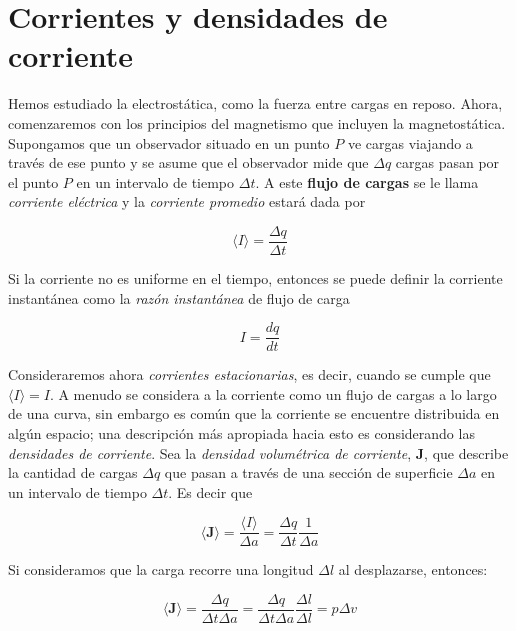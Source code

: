 \section{Corrientes y densidades de corriente}
Hemos estudiado la electrostática, como la fuerza entre cargas en reposo. Ahora, comenzaremos con los principios del magnetismo que incluyen la magnetostática. 
Supongamos que un observador situado en un punto $P$ ve cargas viajando a través de ese punto y se asume que el observador mide que $\Delta q$ cargas pasan por el punto $P$ en un intervalo de tiempo $\Delta t$. A este \textbf{flujo de cargas} se le llama \emph{corriente eléctrica} y la \emph{corriente promedio} estará dada por

\begin{equation}
    \langle I \rangle = \frac{\Delta q}{\Delta t}
\end{equation}

Si la corriente no es uniforme en el tiempo, entonces se puede definir la corriente instantánea como la \emph{razón instantánea} de flujo de carga

\begin{equation}
    I = \frac{dq}{dt}
\end{equation}

Consideraremos ahora \emph{corrientes estacionarias}, es decir, cuando se cumple que $\langle I \rangle = I$. A menudo se considera a la corriente como un flujo de cargas a lo largo de una curva, sin embargo es común que la corriente se encuentre distribuida en algún espacio; una descripción más apropiada hacia esto es considerando las \emph{densidades de corriente}. Sea la \emph{densidad volumétrica de corriente}, \textbf{J}, que describe la cantidad de cargas $\Delta q$ que pasan a través de una sección de superficie $\Delta a$ en un intervalo de tiempo $\Delta t$. Es decir que

\begin{equation}
    \langle \textbf{J} \rangle = \frac{\langle I \rangle}{\Delta a} = \frac{\Delta q}{\Delta t} \frac{1}{\Delta a}
\end{equation}

Si consideramos que la carga recorre una longitud $\Delta l$ al desplazarse, entonces:

\begin{equation}
    \langle \textbf{J} \rangle = \frac{\Delta q}{\Delta t \Delta a} = \frac{\Delta q}{\Delta t \Delta a} \frac{\Delta l}{\Delta l} = p\Delta v 
\end{equation}

